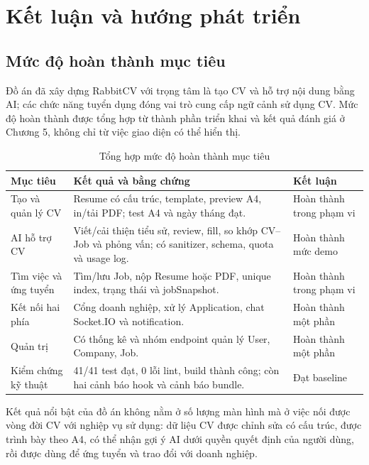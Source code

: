 \chapter{Kết luận và hướng phát triển}

\section{Mức độ hoàn thành mục tiêu}

Đồ án đã xây dựng RabbitCV với trọng tâm là tạo CV và hỗ trợ nội dung bằng AI; các chức năng tuyển dụng đóng vai trò cung cấp ngữ cảnh sử dụng CV. Mức độ hoàn thành được tổng hợp từ thành phần triển khai và kết quả đánh giá ở Chương 5, không chỉ từ việc giao diện có thể hiển thị.

\begin{table}[H]
    \centering
    \small
    \begin{tabularx}{\textwidth}{|p{}|Y|p{0.17\textwidth}|} \hline
        \textbf{Mục tiêu} & \textbf{Kết quả và bằng chứng} & \textbf{Kết luận} \\ \hline
        Tạo và quản lý CV & Resume có cấu trúc, template, preview A4, in/tải PDF; test A4 và ngày tháng đạt. & Hoàn thành trong phạm vi \\ \hline
        AI hỗ trợ CV & Viết/cải thiện tiểu sử, review, fill, so khớp CV--Job và phỏng vấn; có sanitizer, schema, quota và usage log. & Hoàn thành mức demo \\ \hline
        Tìm việc và ứng tuyển & Tìm/lưu Job, nộp Resume hoặc PDF, unique index, trạng thái và jobSnapshot. & Hoàn thành trong phạm vi \\ \hline
        Kết nối hai phía & Cổng doanh nghiệp, xử lý Application, chat Socket.IO và notification. & Hoàn thành một phần \\ \hline
        Quản trị & Có thống kê và nhóm endpoint quản lý User, Company, Job. & Hoàn thành một phần \\ \hline
        Kiểm chứng kỹ thuật & 41/41 test đạt, 0 lỗi lint, build thành công; còn hai cảnh báo hook và cảnh báo bundle. & Đạt baseline \\ \hline
    \end{tabularx}
    \caption{Tổng hợp mức độ hoàn thành mục tiêu}
    \label{tab:objective-completion}
\end{table}

Kết quả nổi bật của đồ án không nằm ở số lượng màn hình mà ở việc nối được vòng đời CV với nghiệp vụ sử dụng: dữ liệu CV được chỉnh sửa có cấu trúc, được trình bày theo A4, có thể nhận gợi ý AI dưới quyền quyết định của người dùng, rồi được dùng để ứng tuyển và trao đổi với doanh nghiệp.

